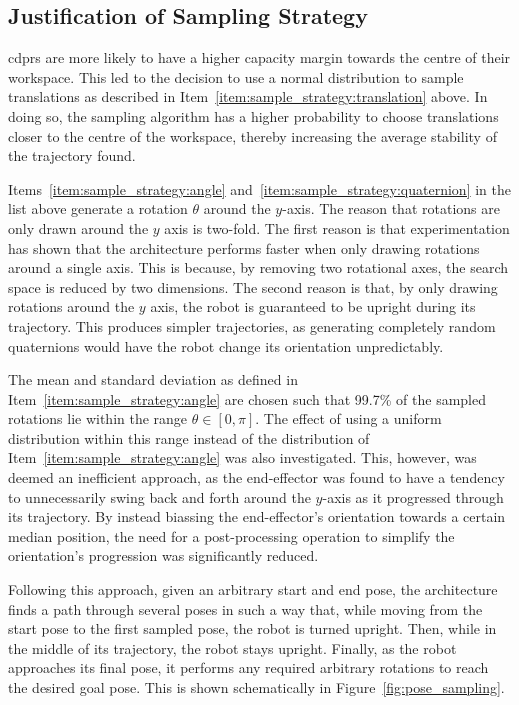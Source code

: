 	\subsection{Justification of Sampling Strategy}%
	\label{sec:justification_of_sampling_strategy}

		\glspl{cdpr} are more likely to have a higher capacity margin towards
		the centre of their workspace. This led to the decision to use a normal
		distribution to sample translations as described in
		Item~\ref{item:sample_strategy:translation} above. In doing so, the
		sampling algorithm has a higher probability to choose translations
		closer to the centre of the workspace, thereby increasing the average
		stability of the trajectory found.

		Items~\ref{item:sample_strategy:angle}
		and~\ref{item:sample_strategy:quaternion} in the list above generate a
		rotation $\theta$ around the $y$-axis. The reason that rotations are
		only drawn around the $y$ axis is two-fold. The first reason is that
		experimentation has shown that the architecture performs faster when
		only drawing rotations around a single axis. This is because, by
		removing two rotational axes, the search space is reduced by two
		dimensions. The second reason is that, by only drawing rotations around
		the $y$ axis, the robot is guaranteed to be upright during its
		trajectory. This produces simpler trajectories, as generating completely
		random quaternions would have the robot change its orientation
		unpredictably.

		The mean and standard deviation as defined in
		Item~\ref{item:sample_strategy:angle} are chosen such that 99.7\% of
		the sampled rotations lie within the range $\theta \in [0, \pi]$.
		The effect of using a uniform distribution within this range instead
		of the distribution of Item~\ref{item:sample_strategy:angle} was
		also investigated. This, however, was deemed an inefficient
		approach, as the end-effector was found to have a tendency to
		unnecessarily swing back and forth around the $y$-axis as it
		progressed through its trajectory. By instead biassing the
		end-effector's orientation towards a certain median position, the
		need for a post-processing operation to simplify the orientation's
		progression was significantly reduced.

		Following this approach, given an arbitrary start and end pose, the
		architecture finds a path through several poses in such a way that,
		while moving from the start pose to the first sampled pose, the
		robot is turned upright. Then, while in the middle of its
		trajectory, the robot stays upright. Finally, as the robot
		approaches its final pose, it performs any required arbitrary
		rotations to reach the desired goal pose. This is shown
		schematically in Figure~\ref{fig:pose_sampling}.

